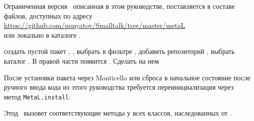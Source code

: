 \clearpage
{}

Ограниченная версия \met\ описанная в этом руководстве, поставляется в составе
файлов, доступных по адресу\\
\url{https://github.com/ponyatov/Smalltalk/tree/master/metaL}\\
или локально в каталоге .


\noindent
создать пустой пакет \met, , выбрать в фильтре \met, добавить репозиторий ,
выбрать каталог . 
В правой части появится . Сделать на нем 



После установки пакета через Monticello или сброса в начальное состояние
после ручного ввода кода из этого руководства требуется переинициализация
через метод \verb|MetaL.install|.

\medskip
{}

Этод \ вызовет соответствующие методы у всех классов,
наследованных от .



